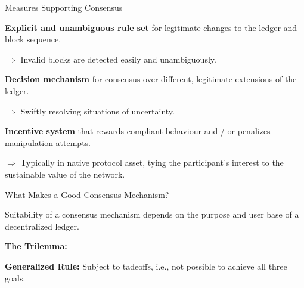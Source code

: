 \documentclass[]{beamer}
\begin{document}
\begin{frame}{Measures Supporting Consensus}

\textbf{Explicit and unambiguous rule set} for legitimate changes to the ledger and block sequence.
\vspace{0.25 em}

$\Rightarrow$ Invalid blocks are detected easily and unambiguously.
\vspace{1.5 em}

\textbf{Decision mechanism} for consensus over different, legitimate extensions of the ledger. 
\vspace{0.25 em}

$\Rightarrow$ Swiftly resolving situations of uncertainty.
\vspace{1.5 em}

\textbf{Incentive system} that rewards compliant behaviour and / or penalizes manipulation attempts.
\vspace{0.25 em}

$\Rightarrow$ Typically in native protocol asset, tying the participant's interest to the sustainable value of the network.

	
\end{frame}

\begin{frame}{What Makes a Good Consensus Mechanism?}

Suitability of a consensus mechanism \color{focus} depends on the purpose and user base \color {black} of a decentralized ledger.
\vspace{1 em}

\textbf{The Trilemma:}

\begin{center}
\begin{tikzpicture}[scale=0.6, every node/.style ={scale=0.8}]
		
\end{tikzpicture}
\end{center}

\textbf{Generalized Rule:} Subject to tadeoffs, i.e., not possible to achieve all three goals. 	
\end{frame}
\end{document}
